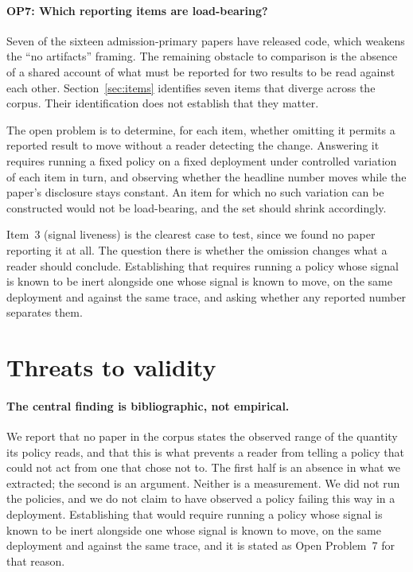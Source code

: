 \paragraph{OP7: Which reporting items are load-bearing?}
Seven of the sixteen admission-primary papers have released code, which
weakens the ``no artifacts'' framing. The remaining obstacle to
comparison is the absence of a shared account of what must be reported
for two results to be read against each other.
Section~\ref{sec:items} identifies seven items that diverge across the
corpus. Their identification does not establish that they matter.

The open problem is to determine, for each item, whether omitting it
permits a reported result to move without a reader detecting the
change. Answering it requires running a fixed policy on a fixed
deployment under controlled variation of each item in turn, and
observing whether the headline number moves while the paper's
disclosure stays constant. An item for which no such variation can be
constructed would not be load-bearing, and the set should shrink
accordingly.

Item~3 (signal liveness) is the clearest case to test, since we found
no paper reporting it at all. The question there is whether the omission
changes what a reader should conclude. Establishing
that requires running a policy whose signal is known to be inert
alongside one whose signal is known to move, on the same deployment and
against the same trace, and asking whether any reported number separates
them.

\section{Threats to validity}
\label{sec:threats}

\paragraph{The central finding is bibliographic, not empirical.} We
report that no paper in the corpus states the observed range of the
quantity its policy reads, and that this is what prevents a reader from
telling a policy that could not act from one that chose not to. The
first half is an absence in what we extracted; the second is an
argument. Neither is a measurement. We did not run the policies, and we
do not claim to have observed a policy failing this way in a
deployment. Establishing that would require running a policy whose
signal is known to be inert alongside one whose signal is known to
move, on the same deployment and against the same trace, and it is
stated as Open Problem~7 for that reason.

